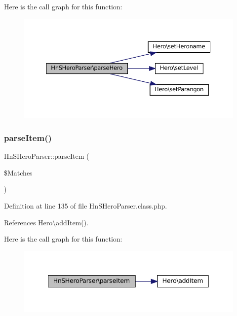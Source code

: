 Here is the call graph for this function\+:\nopagebreak
\begin{figure}[H]
\begin{center}
\leavevmode
\includegraphics[width=350pt]{class_hn_s_hero_parser_af577e30965cb36431463df160e913ff8_cgraph}
\end{center}
\end{figure}
\mbox{\label{class_hn_s_hero_parser_aebda147e79e7e7659ba7976455db095c}} 
\subsubsection{\texorpdfstring{parse\+Item()}{parseItem()}}
{\footnotesize\ttfamily Hn\+S\+Hero\+Parser\+::parse\+Item (\begin{DoxyParamCaption}\item[{}]{\$\+Matches }\end{DoxyParamCaption})\hspace{0.3cm}{\ttfamily [protected]}}



Definition at line 135 of file Hn\+S\+Hero\+Parser.\+class.\+php.



References Hero\textbackslash{}add\+Item().

Here is the call graph for this function\+:\nopagebreak
\begin{figure}[H]
\begin{center}
\leavevmode
\includegraphics[width=341pt]{class_hn_s_hero_parser_aebda147e79e7e7659ba7976455db095c_cgraph}
\end{center}
\end{figure}
\mbox{\label{class_hn_s_hero_parser_ade299a51769e68b2aee30b479942b447}} 

